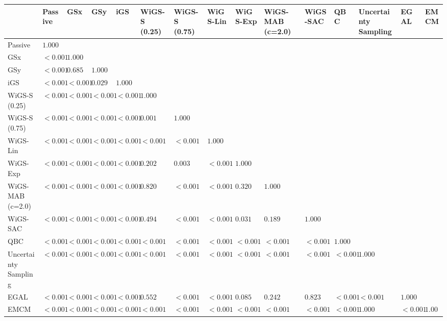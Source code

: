 \begin{tabular}{lllllllllllllll}
\toprule
 & Passive & GSx & GSy & iGS & WiGS-S (0.25) & WiGS-S (0.75) & WiGS-Lin & WiGS-Exp & WiGS-MAB (c=2.0) & WiGS-SAC & QBC & Uncertainty Sampling & EGAL & EMCM \\
\midrule
Passive & $1.000$ &  &  &  &  &  &  &  &  &  &  &  &  &  \\
GSx & $<0.001$ & $1.000$ &  &  &  &  &  &  &  &  &  &  &  &  \\
GSy & $<0.001$ & $0.685$ & $1.000$ &  &  &  &  &  &  &  &  &  &  &  \\
iGS & $<0.001$ & $<0.001$ & $0.029$ & $1.000$ &  &  &  &  &  &  &  &  &  &  \\
WiGS-S (0.25) & $<0.001$ & $<0.001$ & $<0.001$ & $<0.001$ & $1.000$ &  &  &  &  &  &  &  &  &  \\
WiGS-S (0.75) & $<0.001$ & $<0.001$ & $<0.001$ & $<0.001$ & $0.001$ & $1.000$ &  &  &  &  &  &  &  &  \\
WiGS-Lin & $<0.001$ & $<0.001$ & $<0.001$ & $<0.001$ & $<0.001$ & $<0.001$ & $1.000$ &  &  &  &  &  &  &  \\
WiGS-Exp & $<0.001$ & $<0.001$ & $<0.001$ & $<0.001$ & $0.202$ & $0.003$ & $<0.001$ & $1.000$ &  &  &  &  &  &  \\
WiGS-MAB (c=2.0) & $<0.001$ & $<0.001$ & $<0.001$ & $<0.001$ & $0.820$ & $<0.001$ & $<0.001$ & $0.320$ & $1.000$ &  &  &  &  &  \\
WiGS-SAC & $<0.001$ & $<0.001$ & $<0.001$ & $<0.001$ & $0.494$ & $<0.001$ & $<0.001$ & $0.031$ & $0.189$ & $1.000$ &  &  &  &  \\
QBC & $<0.001$ & $<0.001$ & $<0.001$ & $<0.001$ & $<0.001$ & $<0.001$ & $<0.001$ & $<0.001$ & $<0.001$ & $<0.001$ & $1.000$ &  &  &  \\
Uncertainty Sampling & $<0.001$ & $<0.001$ & $<0.001$ & $<0.001$ & $<0.001$ & $<0.001$ & $<0.001$ & $<0.001$ & $<0.001$ & $<0.001$ & $<0.001$ & $1.000$ &  &  \\
EGAL & $<0.001$ & $<0.001$ & $<0.001$ & $<0.001$ & $0.552$ & $<0.001$ & $<0.001$ & $0.085$ & $0.242$ & $0.823$ & $<0.001$ & $<0.001$ & $1.000$ &  \\
EMCM & $<0.001$ & $<0.001$ & $<0.001$ & $<0.001$ & $<0.001$ & $<0.001$ & $<0.001$ & $<0.001$ & $<0.001$ & $<0.001$ & $<0.001$ & $1.000$ & $<0.001$ & $1.000$ \\
\bottomrule
\end{tabular}
